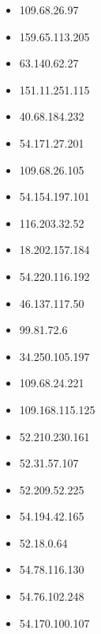 \documentclass{article}
\begin{document}
\begin{itemize}
        \item 109.68.26.97
    
        \item 159.65.113.205
    
        \item 63.140.62.27
    
        \item 151.11.251.115
    
        \item 40.68.184.232
    
        \item 54.171.27.201
    
        \item 109.68.26.105
    
        \item 54.154.197.101
    
        \item 116.203.32.52
    
        \item 18.202.157.184
    
        \item 54.220.116.192
    
        \item 46.137.117.50
    
        \item 99.81.72.6
    
        \item 34.250.105.197
    
        \item 109.68.24.221
    
        \item 109.168.115.125
    
        \item 52.210.230.161
    
        \item 52.31.57.107
    
        \item 52.209.52.225
    
        \item 54.194.42.165
    
        \item 52.18.0.64
    
        \item 54.78.116.130
    
        \item 54.76.102.248
    
        \item 54.170.100.107
    

\end{itemize}
\end{document}
